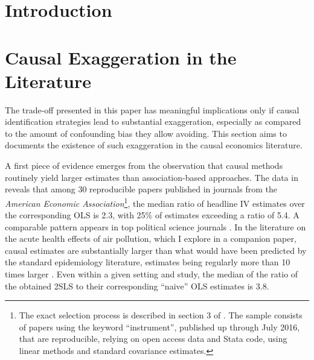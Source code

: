 \documentclass[usletter, 12pt]{article}
\begin{document}
	\section{Introduction}
	
		
	



	\section{Causal Exaggeration in the Literature}\label{lit_review}
	
		The trade-off presented in this paper has meaningful implications only if causal identification strategies lead to substantial exaggeration, especially as compared to the amount of confounding bias they allow avoiding. This section aims to documents the existence of such exaggeration in the causal economics literature. 
		
		A first piece of evidence emerges from the observation that causal methods routinely yield larger estimates than association-based approaches. The data in \cite{young_consistency_2022} reveals that among 30 reproducible papers published in journals from the  \textit{American Economic Association}\footnote{The exact selection process is described in section 3 of \cite{young_consistency_2022}. The sample consists of papers using the keyword ``instrument'', published up through July 2016, that are reproducible, relying on open access data and Stata code, using linear methods and standard covariance estimates.}, the median ratio of headline IV estimates over the corresponding OLS is 2.3, with 25\% of estimates exceeding a ratio of 5.4. A comparable pattern appears in top political science journals \citep{lalHow2024}. In the literature on the acute health effects of air pollution, which I explore in a companion paper, causal estimates are substantially larger than what would have been predicted by the standard epidemiology literature, estimates being regularly more than 10 times larger \citep{bagilet_accurate_2023}. Even within a given setting and study, the median of the ratio of the obtained 2SLS to their corresponding ``naive'' OLS estimates is 3.8. 
		
\end{document}
